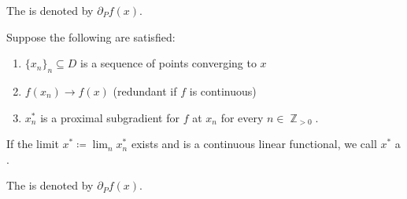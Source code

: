 \begin{definition}
\begin{defenum}
    The  is denoted by \( \partial_P f(x) \).

    \mcite\cite[def. 11.10]{Clarke2013}Suppose the following are satisfied:
    \begin{enumerate}
      \item \( \{ x_n \}_n \subseteq D \) is a sequence of points converging to \( x \)
      \item \( f(x_n) \to f(x) \) (redundant if \( f \) is continuous)
      \item \( x_n^* \) is a proximal subgradient for \( f \) at \( x_n \) for every \( n \in \BbbZ_{>0} \).
    \end{enumerate}

    If the limit \( x^* \coloneqq \lim_n x_n^* \) exists and is a continuous linear functional, we call \( x^* \) a .

    The  is denoted by \( \partial_P f(x) \).
  \end{defenum}
\end{definition}
